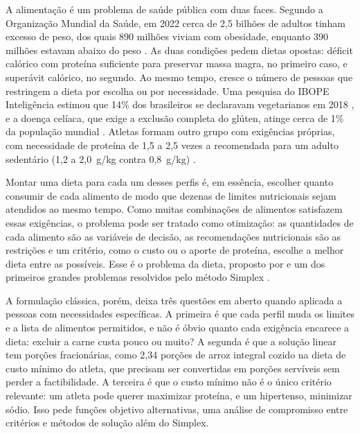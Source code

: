 \documentclass[12pt]{article}
\begin{document}
A alimentação é um problema de saúde pública com duas faces. Segundo a Organização
Mundial da Saúde, em 2022 cerca de 2,5 bilhões de adultos tinham excesso de peso, dos
quais 890 milhões viviam com obesidade, enquanto 390 milhões estavam abaixo do peso
\cite{who2024}. As duas condições pedem dietas opostas: déficit calórico com proteína
suficiente para preservar massa magra, no primeiro caso, e superávit calórico, no
segundo. Ao mesmo tempo, cresce o número de pessoas que restringem a dieta por escolha
ou por necessidade. Uma pesquisa do IBOPE Inteligência estimou que 14\% dos brasileiros
se declaravam vegetarianos em 2018 \cite{ibope2018}, e a doença celíaca, que exige a
exclusão completa do glúten, atinge cerca de 1\% da população mundial
\cite{singh2018}. Atletas formam outro grupo com exigências próprias, com necessidade
de proteína de 1,5 a 2,5 vezes a recomendada para um adulto sedentário (1,2 a 2,0~g/kg
contra 0,8~g/kg) \cite{thomas2016,iom2006}.

Montar uma dieta para cada um desses perfis é, em essência, escolher quanto consumir de
cada alimento de modo que dezenas de limites nutricionais sejam atendidos ao mesmo
tempo. Como muitas combinações de alimentos satisfazem essas exigências, o problema
pode ser tratado como otimização: as quantidades de cada alimento são as variáveis de
decisão, as recomendações nutricionais são as restrições e um critério, como o custo
ou o aporte de proteína, escolhe a melhor dieta entre as possíveis. Esse é o problema
da dieta, proposto por \cite{stigler1945} e um dos primeiros grandes problemas
resolvidos pelo método Simplex \cite{dantzig1963,dantzig1990}.

A formulação clássica, porém, deixa três questões em aberto quando aplicada a pessoas
com necessidades específicas. A primeira é que cada perfil muda os limites e a lista de
alimentos permitidos, e não é óbvio quanto cada exigência encarece a dieta: excluir a
carne custa pouco ou muito? A segunda é que a solução linear tem porções fracionárias,
como 2{,}34 porções de arroz integral cozido na dieta de custo mínimo do atleta, que precisam ser convertidas em porções servíveis sem perder a
factibilidade. A terceira é que o custo mínimo não é o único critério relevante: um
atleta pode querer maximizar proteína, e um hipertenso, minimizar sódio. Isso pede
funções objetivo alternativas, uma análise de compromisso entre critérios e métodos de
solução além do Simplex.
\end{document}
